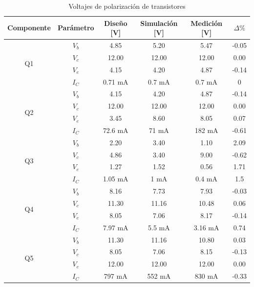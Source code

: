 \begin{table}[H]
\centering
\begin{tabular}{|c|c|c|c|c|c|}
\hline
\textbf{Componente} & \textbf{Parámetro} & \textbf{Diseño [V]} & \textbf{Simulación [V]} & \textbf{Medición [V]} & $\Delta \%$ \\ \hline

\multirow{4}{*}{Q1} & $V_b$ & 4.85 & 5.20 & 5.47 & -0.05 \\ \cline{2-6}
                             & $V_c$ & 12.00 & 12.00 & 12.00 & 0.00 \\ \cline{2-6}
                             & $V_e$ & 4.15 & 4.20 & 4.87 & -0.14 \\ \cline{2-6}
                             & $I_C$ & 0.71 mA & 0.7 mA & 0.7 mA & 0 \\ \hline

\multirow{4}{*}{Q2} & $V_b$ & 4.15 & 4.20 & 4.87 & -0.14 \\ \cline{2-6}
                             & $V_c$ & 12.00 & 12.00 & 12.00 & 0.00 \\ \cline{2-6}
                             & $V_e$ & 3.45 & 8.60 & 8.05 & 0.07 \\ \cline{2-6}
                             & $I_C$ & 72.6 mA & 71 mA & 182 mA & -0.61 \\ \hline

\multirow{4}{*}{Q3} & $V_b$ & 2.20 & 3.40 & 1.10 & 2.09 \\ \cline{2-6}
                             & $V_c$ & 4.86 & 3.40 & 9.00 & -0.62 \\ \cline{2-6}
                             & $V_e$ & 1.27 & 1.52 & 0.56 & 1.71 \\ \cline{2-6}
                             & $I_C$ & 1.05 mA & 1 mA & 0.4 mA & 1.5 \\ \hline

\multirow{4}{*}{Q4} & $V_b$ & 8.16 & 7.73 & 7.93 & -0.03 \\ \cline{2-6}
                             & $V_c$ & 11.30 & 11.16 & 10.48 & 0.06 \\ \cline{2-6}
                             & $V_e$ & 8.05 & 7.06 & 8.17 & -0.14 \\ \cline{2-6}
                             & $I_C$ & 7.97 mA & 5.5 mA & 3.16 mA & 0.74 \\ \hline

\multirow{4}{*}{Q5} & $V_b$ & 11.30 & 11.16 & 10.80 & 0.03 \\ \cline{2-6}
                             & $V_c$ & 8.05 & 7.06 & 8.15 & -0.13 \\ \cline{2-6}
                             & $V_e$ & 12.00 & 12.00 & 12.00 & 0.00 \\ \cline{2-6}
                             & $I_C$ & 797 mA & 552 mA & 830 mA & -0.33 \\ \hline

\end{tabular}
\caption{Voltajes de polarización de transistores}
\label{tab:polarizacion}
\end{table}

